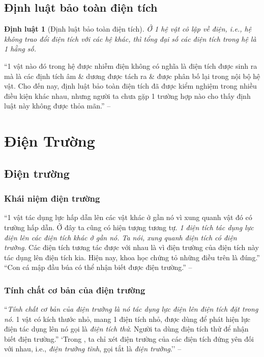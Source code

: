 \documentclass[oneside]{book}
\numberwithin{equation}{section}
\newtheorem{dinhluat}{Định luật}[section]
\begin{document}
\subsection{Định luật bảo toàn điện tích}

\begin{dinhluat}[Định luật bảo toàn điện tích]
	Ở 1 hệ vật cô lập về điện, i.e., hệ không trao đổi điện tích với các hệ khác, thì tổng đại số các điện tích trong hệ là 1 hằng số.
\end{dinhluat}
``1 vật nào đó trong hệ được nhiễm điện không có nghĩa là điện tích được sinh ra mà là các định tích âm \& dương được tách ra \& được phân bố lại trong nội bộ hệ vật. Cho đến nay, định luật bảo toàn điện tích đã được kiểm nghiệm trong nhiều điều kiện khác nhau, nhưng người ta chưa gặp 1 trường hợp nào cho thấy định luật này không được thỏa mãn.'' -- \cite[p. 12]{SGK_Vat_Ly_11_nang_cao}


\section{Điện Trường}

\subsection{Điện trường}

\subsubsection{Khái niệm điện trường}
``1 vật tác dụng lực hấp dẫn lên các vật khác ở gần nó vì xung quanh vật đó có trường hấp dẫn. Ở đây ta cũng có hiện tượng tương tự. \textit{1 điện tích tác dụng lực điện lên các điện tích khác ở gần nó. Ta nói, xung quanh điện tích có điện trường}. Các điện tích tương tác được với nhau là vì điện trường của điện tích này tác dụng lên điện tích kia. Hiện nay, khoa học chứng tỏ những điều trên là đúng.'' ``Con cá mập đầu búa có thể nhận biết được điện trường.'' -- \cite[p. 13]{SGK_Vat_Ly_11_nang_cao}

\subsubsection{Tính chất cơ bản của điện trường}
``\textit{Tính chất cơ bản của điện trường là nó tác dụng lực điện lên điện tích đặt trong nó}. 1 vật có kích thước nhỏ, mang 1 điện tích nhỏ, được dùng để phát hiện lực điện tác dụng lên nó gọi là \textit{điện tích thử}. Người ta dùng điện tích thử để nhận biết điện trường.'' `Trong \cite[Chap. 1]{SGK_Vat_Ly_11_nang_cao}, ta chỉ xét điện trường của các điện tích đứng yên đối với nhau, i.e., \textit{điện trường tĩnh}, gọi tắt là \textit{điện trường}.'' -- \cite[p. 13]{SGK_Vat_Ly_11_nang_cao}
\end{document}
